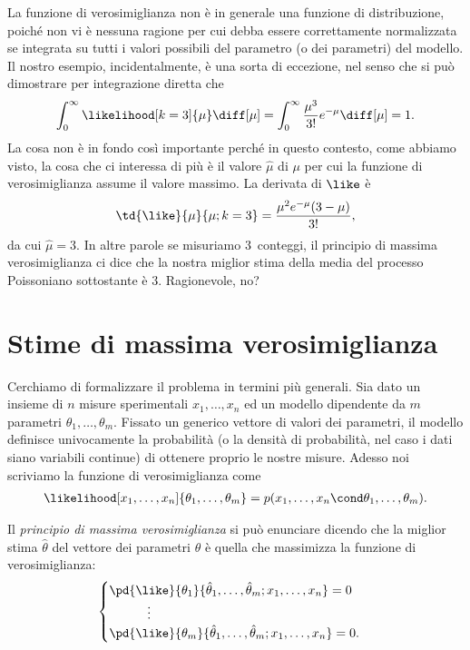 La funzione di verosimiglianza non è in generale una funzione di
distribuzione, poiché non vi è nessuna ragione per cui debba essere
correttamente normalizzata se integrata su tutti i valori possibili del
parametro (o dei parametri) del modello. Il nostro esempio, incidentalmente,
è una sorta di eccezione, nel senso che si può dimostrare per integrazione
diretta che
\begin{align*}
  \int_0^\infty \likelihood[k = 3]{\mu} \diff[\mu] =
  \int_0^\infty \frac{\mu^3}{3!}e^{-\mu} \diff[\mu] = 1.
\end{align*}
La cosa non è in fondo così importante perché in questo contesto, come
abbiamo visto, la cosa che ci interessa di più è il valore $\hat{\mu}$
di $\mu$ per cui la funzione di verosimiglianza assume il valore massimo.
La derivata di $\like$ è
\begin{align*}
  \td{\like}{\mu}{\mu; k = 3} = \frac{\mu^2e^{-\mu}(3 - \mu)}{3!},
\end{align*}
da cui $\hat{\mu} = 3$. In altre parole se misuriamo $3$~conteggi, il principio
di massima verosimiglianza ci dice che la nostra miglior stima della media
del processo Poissoniano sottostante è $3$. Ragionevole, no?


\section{Stime di massima verosimiglianza}

Cerchiamo di formalizzare il problema in termini più generali. Sia dato un
insieme di $n$ misure sperimentali $x_1,\ldots,x_n$ ed un modello dipendente da
$m$ parametri $\theta_1,\ldots,\theta_m$. Fissato un generico vettore di valori
dei parametri, il modello definisce univocamente la probabilità (o la
densità di probabilità, nel caso i dati siano variabili continue) di
ottenere proprio le nostre misure. Adesso noi scriviamo la funzione di
verosimiglianza come
\begin{align}
  \likelihood[x_1,\ldots,x_n]{\theta_1,\ldots,\theta_m} =
  p(x_1,\ldots,x_n \cond \theta_1,\ldots,\theta_m).
\end{align}

Il \emph{principio di massima verosimiglianza} si può enunciare dicendo che la
miglior stima $\hat\theta$ del vettore dei parametri $\theta$ è quella che
massimizza la funzione di verosimiglianza:
\begin{align}
  \begin{cases}
    \pd{\like}{\theta_1}{\hat\theta_1,\ldots,\hat\theta_m;x_1,\ldots,x_n} = 0\\
    \hspace*{30pt}\vdots \\
    \pd{\like}{\theta_m}{\hat\theta_1,\ldots,\hat\theta_m;x_1,\ldots,x_n} = 0.
   \end{cases}
\end{align}


